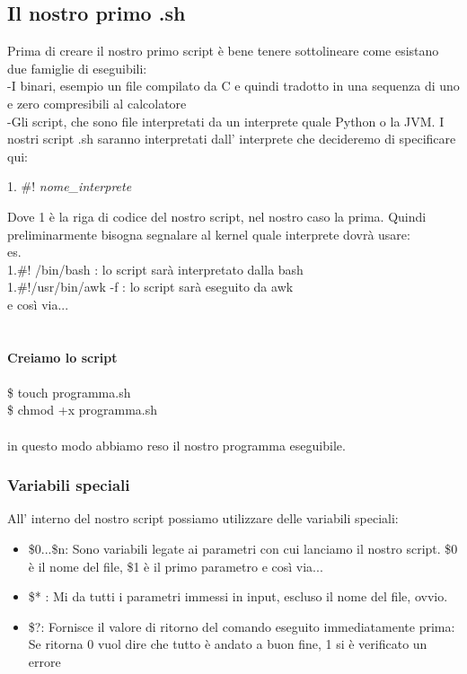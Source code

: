 \documentclass[a4paper,12pt]{article} %
\begin{document}
\subsection{Il nostro primo .sh}
Prima di creare il nostro primo script è bene tenere sottolineare come esistano due famiglie di eseguibili:\\
-I binari, esempio un file compilato da C e quindi tradotto in una sequenza di uno e zero compresibili al calcolatore\\
-Gli script, che sono file interpretati da un interprete quale Python o la JVM. I nostri script .sh saranno interpretati dall' interprete che decideremo di specificare qui:\\
\begin{center}
1. \#!  \textit{nome\_interprete}
\end{center}
Dove 1 è la riga di codice del nostro script, nel nostro caso la prima. Quindi preliminarmente bisogna segnalare al kernel quale interprete dovrà usare:	\\
es.\\
1.\#! /bin/bash : lo script sarà interpretato dalla bash\\
1.\#!/usr/bin/awk -f : lo script sarà eseguito da awk\\
e così via...\\ \\ \\
\textbf{Creiamo lo script}\\ \\
\$ touch programma.sh\\
\$ chmod +x programma.sh\\
\\ in questo modo abbiamo reso il nostro programma eseguibile.

\subsubsection{Variabili speciali}
All' interno del nostro script possiamo utilizzare delle variabili speciali:\\
\begin{itemize}
\item \$0...\$n: Sono variabili legate ai parametri con cui lanciamo il nostro script. \$0 è il nome del file, \$1 è il primo parametro e così via...
\item \$* : Mi da tutti i parametri immessi in input, escluso il nome del file, ovvio.
\item \$?: Fornisce il valore di ritorno del comando eseguito immediatamente prima: Se ritorna 0 vuol dire che tutto è andato a buon fine, 1 si è verificato un errore
\end{itemize}
\end{document}
